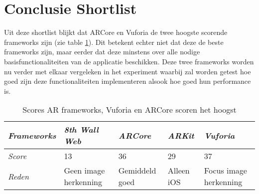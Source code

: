\section{Conclusie Shortlist}
Uit deze shortlist blijkt dat ARCore en Vuforia de twee hoogste scorende frameworks zijn (zie table \ref{tbl:arscore}). Dit betekent echter niet dat deze de beste frameworks zijn, maar eerder dat deze minstens over alle nodige basisfunctionaliteiten van de applicatie beschikken. Deze twee frameworks worden nu verder met elkaar vergeleken in het experiment waarbij zal worden getest hoe goed zijn deze functionaliteiten implementeren alsook hoe goed hun performance is.
\begin{table}[]
    \centering
    \begin{tabular}{@{}lllll@{}}
        \toprule
        \textit{Frameworks} & \textit{8th Wall Web} & \textit{ARCore} & \textit{ARKit} & \textit{Vuforia}       \\ \midrule
        \textit{Score}      & 13                    & 36              & 29             & 37                     \\
        \textit{Reden}      & Geen image herkenning & Gemiddeld goed  & Alleen iOS     & Focus image herkenning \\ \bottomrule
    \end{tabular}
    \caption{Scores AR frameworks, Vuforia en ARCore scoren het hoogst}
    \label{tbl:arscore}
\end{table}